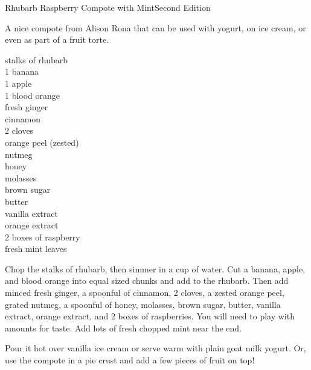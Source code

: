 \begin{entry}{Rhubarb Raspberry Compote with Mint}{Second Edition}

\begin{open}
  A nice compote from Alison Rona that can be used with yogurt, on ice cream,
  or even as part of a fruit torte.
\end{open}
\begin{ingredients}
    stalks of rhubarb\\
    1 banana\\
    1 apple\\
    1 blood orange\\
    fresh ginger\\
    cinnamon\\
    2 cloves\\
    orange peel (zested)\\
    nutmeg\\
    honey\\
    molasses\\
    brown sugar\\
    butter\\
    vanilla extract\\
    orange extract\\
    2 boxes of raspberry\\
    fresh mint leaves
\end{ingredients}
Chop the stalks of rhubarb, then simmer in a cup of water.  Cut a banana,
apple, and blood orange into equal sized chunks and add to the rhubarb.  Then
add minced fresh ginger, a spoonful of cinnamon, 2 cloves, a zested orange peel,
grated nutmeg, a spoonful of honey, molasses, brown sugar, butter, vanilla
extract, orange extract, and 2 boxes of raspberries.  You will need to play with
amounts for taste.  Add lots of fresh chopped mint near the end.

Pour it hot over vanilla ice cream or serve warm with plain goat milk yogurt.
Or, use the compote in a pie crust and add a few pieces of fruit on top!
\end{entry}

